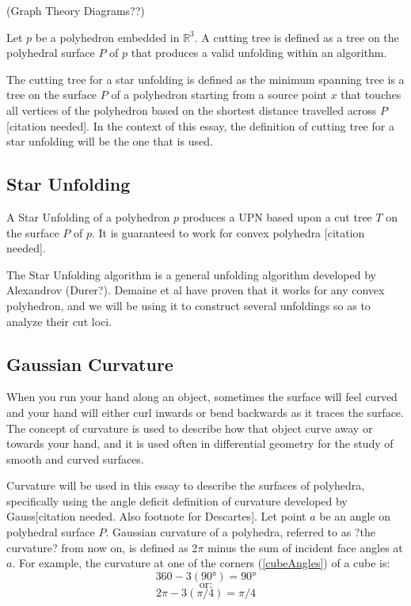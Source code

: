 \documentclass[12 pt]{article}
\begin{document}
(Graph Theory Diagrams??)

Let $p$ be a polyhedron embedded in $\mathbb{R}^3$. A cutting tree is defined as a tree on the polyhedral surface $P$ of $p$ that produces a valid unfolding within an algorithm. 

The cutting tree for a star unfolding is defined as the minimum spanning tree is a tree on the surface $P$ of a polyhedron starting from a source point $x$ that touches all vertices of the polyhedron based on the shortest distance travelled across $P$ [citation needed]. In the context of this essay, the definition of cutting tree for a star unfolding will be the one that is used.
\subsection*{Star Unfolding}

A Star Unfolding of a polyhedron $p$ produces a UPN based upon a cut tree $T$ on the surface $P$ of $p$. It is guaranteed to work for convex polyhedra [citation needed]. 

The Star Unfolding algorithm is a general unfolding algorithm developed by Alexandrov (Durer?). Demaine et al have proven that it works for any convex polyhedron, and we will be using it to construct several unfoldings so as to analyze their cut loci.

\subsection*{Gaussian Curvature}
When you run your hand along an object, sometimes the surface will feel curved and your hand will either curl inwards or bend backwards as it traces the surface. The concept of curvature is used to describe how that object curve away or towards your hand, and it is used often in differential geometry for the study of smooth and curved surfaces.

Curvature will be used in this essay to describe the surfaces of polyhedra, specifically using the angle deficit definition of curvature developed by Gauss[citation needed. Also footnote for Descartes]. Let point $a$ be an angle on polyhedral surface $P$. Gaussian curvature of a polyhedra, referred to as ?the curvature? from now on, is defined as 2$\pi$ minus the sum of incident face angles at $a$.
For example, the curvature at one of the corners (\ref{cubeAngles}) of a cube is: 
$$360-3(\ang{90}) = \ang{90}$$
$$\mbox{or:}$$
$$2\pi - 3(\pi/4) = \pi/4$$
\end{document}
